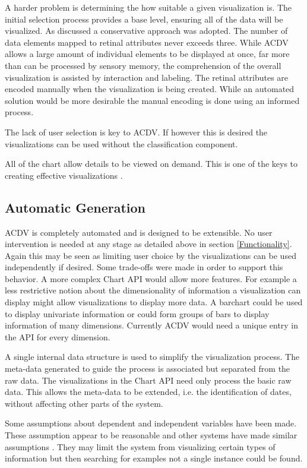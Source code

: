\documentclass[a4paper, 11pt, titlepage, onehalfspacing]{report}
\begin{document}
A harder problem is determining the how suitable a given visualization is. The initial selection process provides a base level, ensuring all of the data will be visualized. As discussed a conservative approach was adopted. The number of data elements mapped to retinal attributes never exceeds three. While AC\lightning{}DV allows a large amount of individual elements to be displayed at once, far more than can be processed by sensory memory, the comprehension of the overall visualization is assisted by interaction and labeling. The retinal attributes are encoded manually when the visualization is being created. While an automated solution would be more desirable the manual encoding is done using an informed process. 

The lack of user selection is key to AC\lightning{}DV. If however this is desired the visualizations can be used without the classification component.


All of the chart allow details to be viewed on demand. This is one of the keys to creating effective visualizations \cite{shneiderman1996eyes}. 

\subsection{Automatic Generation}
AC\lightning{}DV is completely automated and is designed to be extensible. No user intervention is needed at any stage as detailed above in section \ref{Functionality}. Again this may be seen as limiting user choice by the visualizations can be used independently if desired. Some trade-offs were made in order to support this behavior. A more complex Chart API would allow more features. For example a less restrictive notion about the dimensionality of information a visualization can display might allow visualizations to display more data. A barchart could be used to display univariate information or could form groups of bars to display information of many dimensions. Currently AC\lightning{}DV would need a unique entry in the API for every dimension.

A single internal data structure is used to simplify the visualization process. The meta-data generated to guide the process is associated but separated from the raw data. The visualizations in the Chart API need only process the basic raw data. This allows the meta-data to be extended, i.e. the identification of dates, without affecting other parts of the system. 

Some assumptions about dependent and independent variables have been made. These assumption appear to be reasonable and other systems have made similar assumptions \cite{stolte2002polaris}. They may limit the system from visualizing certain types of information but then searching for examples not a single instance could be found. 
\end{document}
